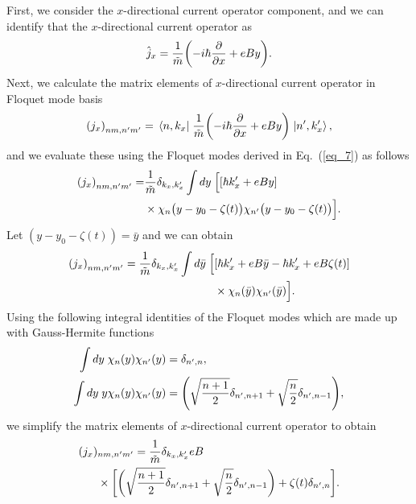 First, we consider the $x$-directional current operator component, and we can identify that the $x$-directional current operator as
\begin{equation} \label{eq_d4}
  \hat{j}_x = \frac{1}{\tilde{m}} \qty(-i\hbar\pdv{x} + eBy).
\end{equation}
Next, we calculate the matrix elements of $x$-directional current operator in Floquet mode basis
\begin{equation} \label{eq_d5}
  \qty({j}_x)_{nm,n'm'} =
  \mel{n,k_x}{\;\frac{1}{\tilde{m}} \qty(-i\hbar\pdv{x} + eBy)\;}{n',k'_x},
\end{equation}
and we evaluate these using the Floquet modes derived in Eq.~(\ref{eq_7}) as follows
\begin{equation} \label{eq_d6}
  \begin{aligned}
    \qty({j}_x)_{nm,n'm'} = &
    \frac{1}{{\tilde{m}}}
    \delta_{k_x,k'_x}
    \int dy \;
    \Big[
    \qty[\hbar k'_x + eBy] \\
    & \times
     \chi_{n}\big(y - y_0 - \zeta(t)\big)
    \chi_{n'}\big(y - y_0 - \zeta(t)\big)
    \Big].
  \end{aligned}
\end{equation}
Let $(y - y_0 - \zeta(t)) = \bar{y}$ and we can obtain
\begin{equation} \label{eq_d7}
  \begin{aligned}
    \qty({j}_x)_{nm,n'm'} =
    \frac{1}{{\tilde{m}}}
    \delta_{k_x,k'_x}
    \int d\bar{y} \;
    \Big[ &
    \qty[\hbar k'_x + eB\bar{y} -\hbar k'_x + eB\zeta(t)] \\
    & \times
    \chi_{n}(\bar{y})
    \chi_{n'}(\bar{y})
    \Big].
  \end{aligned}
\end{equation}
Using the following integral identities of the Floquet modes which are made up with Gauss-Hermite functions \cite{vedenyapin11,szego59}
\begin{subequations} \label{eq_d8}
  \begin{align}
    \int d{y} \;
    \chi_{n}({y})
    \chi_{n'}({y}) &=
    \delta_{n',n}, \\
    \int dy \;
    y
    \chi_{n}({y})
    \chi_{n'}({y}) &=
    \qty(\sqrt{\frac{n+1}{2}} \delta_{n',n+1} + \sqrt{\frac{n}{2}}
    \delta_{n',n-1}),
  \end{align}
\end{subequations}
we simplify the matrix elements of $x$-directional current operator to obtain
\begin{equation} \label{eq_d9}
  \begin{aligned}
    \qty({j}_x)&_{nm,n'm'} =
    \frac{1}{{\tilde{m}}}
    \delta_{k_x,k'_x}
    eB\\
    & \times
    \bigg[
    \bigg(\sqrt{\frac{n+1}{2}} \delta_{n',n+1} + \sqrt{\frac{n}{2}}
    \delta_{n',n-1}\bigg)
    + \zeta(t) \delta_{n',n}
    \bigg].
  \end{aligned}
\end{equation}

